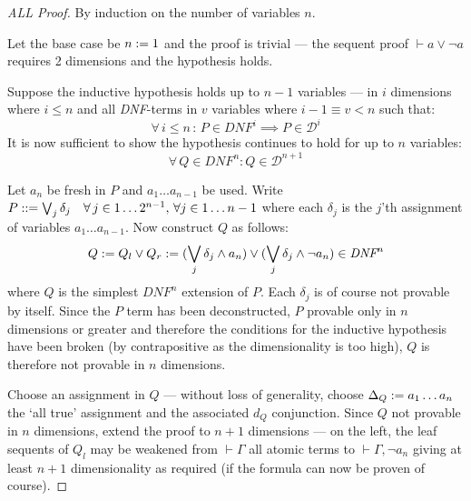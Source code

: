     \begin{proof}[ALL Proof]
        By induction on the number of variables $n$.

        Let the base case be $n := 1$ and the proof is trivial --- the sequent proof $\vdash a \vee \neg a$ requires 2 dimensions and the hypothesis holds.

        Suppose the inductive hypothesis holds up to $n - 1$ variables --- in $i$ dimensions where $i \leq n$ and all \textit{DNF}-terms in $v$ variables where $i - 1 \equiv v < n$ such that:
        \begin{equation*}
            \forall \, i \leq n \,:\, P \in \textit{DNF}^{i} \implies P \in \mathcal{D}^{i}
        \end{equation*}
        It is now sufficient to show the hypothesis continues to hold for up to $n$ variables:
        \begin{equation*}
            \forall \, Q \in \textit{DNF}^n :  Q \in \mathcal{D}^{n+1}
        \end{equation*}

        Let $a_n$ be fresh in $P$ and $a_1 \ldots a_{n-1}$ be used.
        Write $P ::= \bigvee_j \delta_j \quad \forall \, j \in 1 \ldots 2^{n-1}, \, \forall j \in 1 \ldots n-1$ where each $\delta_j$ is the $j$'th assignment of variables $a_1 \ldots a_{n-1}$.
        Now construct $Q$ as follows:
        \begin{equation*}
            Q := Q_{l} \vee Q_{r} := (\bigvee_j \delta_j \wedge a_n) \vee (\bigvee_j \delta_j \wedge \neg a_n) \in \textit{DNF}^n
        \end{equation*}
        where $Q$ is the simplest $\textit{DNF}^n$ extension of $P$.
        Each $\delta_j$ is of course not provable by itself.
        Since the $P$ term has been deconstructed, $P$ provable only in $n$ dimensions or greater and therefore the conditions for the inductive hypothesis have been broken (by contrapositive as the dimensionality is too high), $Q$ is therefore not provable in $n$ dimensions.

        Choose an assignment in $Q$ --- without loss of generality, choose $\Delta_Q := a_1 \ldots a_n$ the `all true' assignment and the associated $d_Q$ conjunction.
        Since $Q$ not provable in $n$ dimensions, extend the proof to $n+1$ dimensions --- on the left, the leaf sequents of $Q_l$ may be weakened from $\vdash \Gamma$ all atomic terms to $\vdash \Gamma, \neg a_n$ giving at least $n + 1$ dimensionality as required (if the formula can now be proven of course).


\end{proof}
